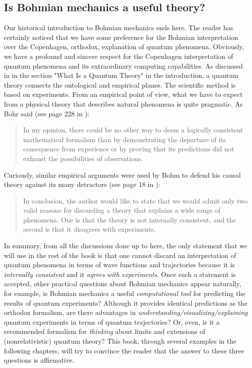 \documentclass[nofootinbib, secnumarabic, amsmath, nobibnotes,11pt,aps,pra, floatfix]{revtex4-1}
\begin{document}
\vspace*{-6pt}
\subsection{Is Bohmian mechanics a useful theory?}\label{om.sec_intro.10}

Our historical introduction to Bohmian mechanics ends here. The
reader has certainly noticed that we have some preference for the
Bohmian interpretation over the Copenhagen, orthodox, explanation of
quantum phenomena. Obviously, we have a profound and
sincere respect for the Copenhagen interpretation of quantum
phenomena and its extraordinary computing capabilities. As discussed in in the section "What Is a Quantum Theory" in the introduction, a quantum theory connects the ontological and empirical planes. The scientific method is based on experiments. From an empirical point of view, 
what we have to expect from a physical theory that describes
natural phenomena is quite pragmatic. As Bohr said (see page 228 in
\cite{om.bohr1949}):\\
\begin{quote}
In my opinion, there could be no other way to deem a logically consistent mathematical formalism than by demonstrating the departure of its consequence from experience or by proving that its predictions did not exhaust the possibilities of observations.\\
\end{quote}
Curiously, similar empirical arguments were used by Bohm to defend his causal theory against its many detractors (see page 18 in \cite{om.Bohm1953b}):\\
\begin{quote}
In conclusion, the author would like to state that we would admit only two valid reasons for discarding a theory that explains a wide range of phenomena. One is that the theory is not internally consistent, and the second is that it disagrees with experiments.\\
\end{quote}\vspace*{-12pt}
In summary, from all the discussions done up to here, the only
statement that we will use in the rest of the book is that one
cannot discard an interpretation of quantum phenomena in terms of
wave functions and trajectories because it is \textit{internally consistent}
and it \textit{agrees with experiments}. Once such a statement is
accepted, other practical questions about Bohmian mechanics appear
naturally, for example, is Bohmian mechanics a useful
\textit{computational tool} for predicting the results of quantum experiments?
Although it provides identical predictions as the orthodox
formalism, are there advantages in
\textit{understanding/visualizing/explaining} quantum experiments in
terms of quantum trajectories? Or, even, is it a recommended
formalism for \textit{thinking} about limits and extensions of
(nonrelativistic) quantum theory? This book, through several
examples in the following chapters, will try to convince the reader
that the answer to these three questions is affirmative.
\end{document}
